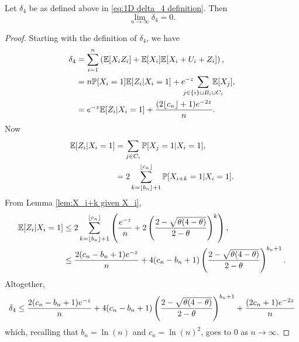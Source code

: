 	\begin{lemma}
	\label{lem:delta4 goes to 0}
		Let $\delta_4$ be as defined above in \eqref{eq:1D delta_4 definition}. Then
		\begin{equation}
			\lim_{n\rightarrow\infty} \delta_4 = 0.
		\end{equation}
	\end{lemma}
	\begin{proof}
		Starting with the definition of $\delta_4$, we have
		\begin{align}
			\delta_4 &= \sum_{i = 1}^n \left(\expect[X_i Z_i] + \expect[X_i]\expect[X_i + U_i + Z_i]\right),\\
				&= n \prob[X_i = 1] \expect[Z_i | X_i = 1] + \euler^{-z} \hspace{-15pt} \sum_{j \in \{i\}\cup B_i \cup C_i} \hspace{-15pt} \expect[X_j],\\
				&= \euler^{-z}\expect[Z_i | X_i = 1] + \frac{(2\lfloor c_n\rfloor+1)\euler^{-2z}}{n}.
		\end{align}
		Now
		\begin{align}
			\mathbb{E}[Z_i | X_i = 1] &= \sum_{j \in C_i} \mathbb{P}[X_j = 1 | X_i = 1],\\
			&= 2 \sum_{k = \lfloor b_n \rfloor + 1}^{\lfloor c_n\rfloor} \mathbb{P}[X_{i+k} = 1 | X_i = 1].
		\end{align}
		From Lemma \ref{lem:X_i+k given X_i},
		\begin{align}
			\mathbb{E}[Z_i | X_i = 1] &\leq 2 \sum_{k = \lfloor b_n\rfloor + 1}^{\lfloor c_n\rfloor} \left(\frac{e^{-z}}{n} + 2\left(\frac{2 - \sqrt{\theta(4 - \theta)}}{2 - \theta}\right)^k\right),\\
				&\leq \frac{2(c_n - b_n + 1)e^{-z}}{n} + 4(c_n - b_n + 1)\left(\frac{2 - \sqrt{\theta(4 - \theta)}}{2 - \theta}\right)^{b_n + 1}.
		\end{align}
		Altogether,
		\begin{equation}
			\delta_4 \leq \frac{2(c_n - b_n + 1)e^{-z}}{n} + 4(c_n - b_n + 1)\left(\frac{2 - \sqrt{\theta(4 - \theta)}}{2 - \theta}\right)^{b_n + 1} + \frac{(2c_n + 1)e^{-2z}}{n}
		\end{equation}
		which, recalling that $b_n = \ln(n)$ and $c_n = \ln(n)^2$, goes to $0$ as $n \rightarrow \infty$.
	\end{proof}

